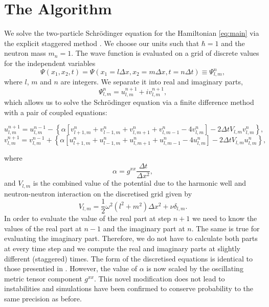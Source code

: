 \section{The Algorithm}

We solve the two-particle Schr\"{o}dinger equation for the Hamiltonian
\eqref{eq:main} via the explicit staggered method \cite{numerics}. We
choose our units such that $\hbar = 1$ and the neutron mass $m_n =
1$. The wave function is evaluated on a grid of discrete values for
the independent variables
\begin{equation}
\Psi(x_1, x_2, t) = \Psi(x_1 = l\Delta x, x_2 = m\Delta x, t = n\Delta
t) \equiv \Psi^n_{l, m},
\end{equation}
where $l$, $m$ and $n$ are integers. We separate it into real and
imaginary parts,
\begin{equation}
\Psi^n_{l,m} = u^{n+1}_{l,m} + iv^{n+1}_{l,m},
\end{equation}
which allows us to solve the Schr\"{o}dinger equation via a finite
difference method with a pair of coupled equations:
\begin{samepage}
\begin{equation}
u^{n+1}_{l,m} = u^{n-1}_{l,m} - \left\{ \alpha \left[ v^n_{l+1,m} +
  v^n_{l-1,m} + v^n_{l,m+1} + v^n_{l,m-1} - 4v^n_{l,m} \right] - 2
\Delta t V_{l,m}v^n_{l,m} \right\} ,
\end{equation}
\begin{equation}
v^{n+1}_{l,m} = v^{n-1}_{l,m} + \left\{ \alpha \left[ u^n_{l+1,m} +
  u^n_{l-1,m} + u^n_{l,m+1} + u^n_{l,m-1} - 4u^n_{l,m} \right] - 2
\Delta t V_{l,m}u^n_{l,m} \right\},
\end{equation}
\end{samepage}
where 
\begin{equation}
\alpha = g^{xx}\frac{\Delta t}{\Delta x^2},
\end{equation}
and $V_{l,m}$ is the combined value of the potential due to the
harmonic well and neutron-neutron interaction on the discretised
grid given by
\begin{equation}
V_{l,m} = \frac{1}{2}\omega^2(l^2 + m^2)\Delta x^2 + \nu\delta_{l,m}.
\end{equation}
In order to evaluate the value of the real part at step $n+1$ we need
to know the values of the real part at $n-1$ and the imaginary part at
$n$. The same is true for evaluating the imaginary part. Therefore, we
do not have to calculate both parts at every time step and we compute
the real and imaginary parts at slightly different (staggered)
times. The form of the discretised equations is identical to those
presentied in \cite{numerics}. However, the value of $\alpha$ is now
scaled by the oscillating metric tensor component $g^{xx}$. This novel
modification does not lead to instabilities and simulations have been
confirmed to conserve probability to the same precision as before.

